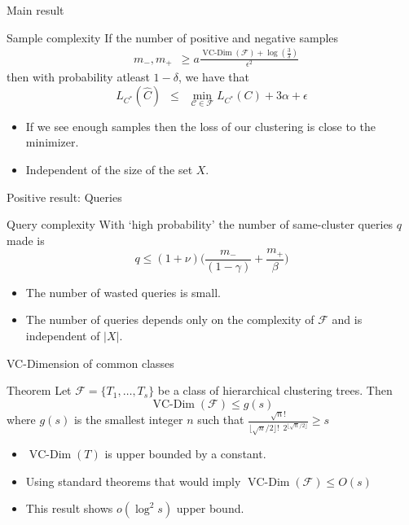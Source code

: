 \documentclass{beamer}
\newcommand{\mc}{\mathcal}
\DeclareMathOperator*{\vcdim}{VC-Dim}
\begin{document}
\begin{frame}{Main result}
	\begin{block}{Sample complexity}
		If the number of positive and negative samples   
		\vspace{-10pt}\begin{align*}
		  &m_-, m_+ \enspace \ge a\frac{\vcdim({\mc F}) + \log(\frac{3}{\delta})}{\epsilon^2} 
		\end{align*}
		then with probability atleast $1-\delta$, we have that $$L_{C^*}(\hat C) \enspace\le\enspace \min_{\mc C \in \mc F} L_{C^*}(C) + 3\alpha + \epsilon$$
	\end{block}
	
	\begin{itemize}
		\vspace{20pt}\item If we see enough samples then the loss of our clustering is close to the minimizer.\\
		\vspace{10pt} \item Independent of the size of the set $X$.
	\end{itemize}		
\end{frame}

\begin{frame}{Positive result: Queries}
	\begin{block}{Query complexity}
		With `high probability' the number of same-cluster queries $q$ made is  
		\vspace{-10pt}$$q \le (1+\nu)\bigg(\frac{m_-}{(1-\gamma)} + \frac{m_+}{\beta}\bigg)$$
	\end{block}
	\begin{itemize}
		\vspace{20pt} \item The number of wasted queries is small.
		\vspace{20pt} \item The number of queries depends only on the complexity of $\mc F$ and is independent of $|X|$.  
	\end{itemize}
\end{frame}

\begin{frame}{VC-Dimension of common classes}
	\begin{block}{Theorem}
		Let $\mc F = \{T_1, \ldots, T_s\}$ be a class of hierarchical clustering trees. Then 
		$$\vcdim({\mc F}) \le g(s)$$ where $g(s)$ is the smallest integer $n$ such that $\frac{\sqrt n!}{\lfloor \sqrt n/2 \rfloor! \enspace 2^{\lfloor \sqrt n/2 \rfloor}} \ge s $
	\end{block}
	
	\begin{itemize}
		\vspace{30pt}\item $\vcdim(T)$ is upper bounded by a constant.
		\vspace{10pt}\item Using standard theorems that would imply $\vcdim(\mc F) \le O(s)$
		\vspace{10pt}\item This result shows $o(\log^2 s)$ upper bound.
	\end{itemize}
\end{frame}
\end{document}
